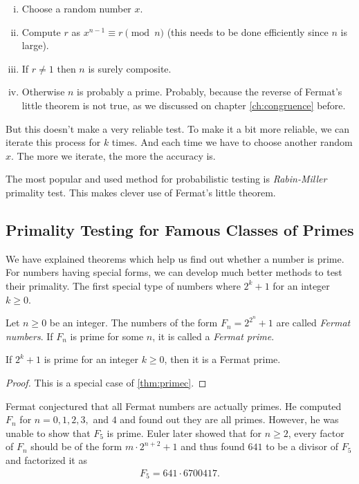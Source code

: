 \documentclass{subfiles}
\begin{document}
		\begin{enumerate}[i.]
			\item Choose a random number $x$.
			\item Compute $r$ as $x^{n-1}\equiv r\pmod n$ (this needs to be done efficiently since $n$ is large).
			\item If $r\neq1$ then $n$ is surely composite.
			\item Otherwise $n$ is probably a prime. Probably, because the reverse of Fermat's little theorem is not true, as we discussed on chapter \eqref{ch:congruence} before.
		\end{enumerate}
	But this doesn't make a very reliable test. To make it a bit more reliable, we can iterate this process for $k$ times. And each time we have to choose another random $x$. The more we iterate, the more the accuracy is.

	The most popular and used method for probabilistic testing is \textit{Rabin-Miller} primality test. This makes clever use of Fermat's little theorem.

\subsection{Primality Testing for Famous Classes of Primes}
	We have explained theorems which help us find out whether a number is prime. For numbers having special forms, we can develop much better methods to test their primality. The first special type of numbers where $2^k+1$ for an integer $k \geq 0$.

		\begin{definition}
			Let $n\geq 0$ be an integer. The numbers of the form $F_n = 2^{2^n}+1$ are called \textit{Fermat numbers}. If $F_n$ is prime for some $n$, it is called a \textit{Fermat prime}.
		\end{definition}

		\begin{proposition}
			If $2^k+1$ is prime for an integer $k \geq 0$, then it is a Fermat prime.
		\end{proposition}

		\begin{proof}
			This is a special case of \autoref{thm:primec}.
		\end{proof}

	Fermat conjectured that all Fermat numbers are actually primes. He computed $F_n$ for $n=0,1,2,3,$ and $4$ and found out they are all primes. However, he was unable to show that $F_5$ is prime. Euler later showed that for $n\geq 2$, every factor of $F_n$ should be of the form $m\cdot 2^{n+2}+1$ and thus found $641$ to be a divisor of $F_5$ and factorized it as
		\begin{align*}
		F_5 = 641 \cdot 6700417.
		\end{align*}
\end{document}
